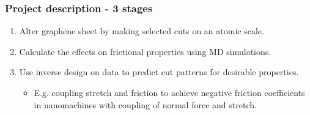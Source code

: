 \documentclass[
	10pt, %
]{beamer}
\begin{document}
\begin{frame}
	\frametitle{Project description - 3 stages}

	\begin{enumerate}
		\item Alter graphene sheet by making selected cuts on an atomic scale. %
		\item Calculate the effects on frictional properties using MD simulations.
		\item Use inverse design on data to predict cut patterns for desirable properties.
		\begin{itemize}
			\item E.g. coupling stretch and friction to achieve negative friction coefficients in nanomachines with coupling of normal force and stretch. 
		\end{itemize} 
	\end{enumerate}

	
\end{frame}
\end{document}
